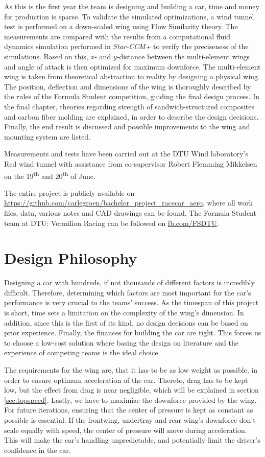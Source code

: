  As this is the first year the team is designing and building a car, time and money for production is sparse. To validate the simulated optimizations, a wind tunnel test is performed on a down-scaled wing using Flow Similarity theory. The measurements are compared with the results from a computational fluid dynamics simulation performed in \emph{Star-CCM+} to verify the preciseness of the simulations. Based on this, $x$- and $y$-distance between the multi-element wings and angle of attack is then optimized for maximum downforce. The multi-element wing is taken from theoretical abstraction to reality by designing a physical wing. The position, deflection and dimensions of the wing is thoroughly described by the rules of the Formula Student competition, guiding the final design process. In the final chapter, theories regarding strength of sandwich-structured composites and carbon fiber molding are explained, in order to describe the design decisions. Finally, the end result is discussed and possible improvements to the wing and mounting system are listed.

  Measurements and tests have been carried out at the DTU Wind laboratory's Red wind tunnel with assistance from co-supervisor Robert Flemming Mikkelsen on the 19\textsuperscript{th} and 20\textsuperscript{th} of June.

  The entire project is publicly available on \url{https://github.com/carlegroen/bachelor_project_racecar_aero}, where all work files, data, various notes and CAD drawings can be found. The Formula Student team at DTU: Vermilion Racing can be followed on \url{fb.com/FSDTU}.

\section{Design Philosophy}
  Designing a car with hundreds, if not thousands of different factors is incredibly difficult. Therefore, determining which factors are most important for the car's performance is very crucial to the teams' success. As the timespan of this project is short, time sets a limitation on the complexity of the wing's dimension. In addition, since this is the first of its kind, no design decisions can be based on prior experience. Finally, the finances for building the car are tight. This forces us to choose a low-cost solution where basing the design on literature and the experience of competing teams is the ideal choice.

  The requirements for the wing are, that it has to be as low weight as possible, in order to ensure optimum acceleration of the car. Thereto, drag has to be kept low, but the effect from drag is near negligible, which will be explained in section \ref{sec:topspeed}. Lastly, we have to maximize the downforce provided by the wing. For future iterations, ensuring that the center of pressure is kept as constant as possible is essential. If the frontwing, undertray and rear wing's downforce don't scale equally with speed, the center of pressure will move during acceleration. This will make the car's handling unpredictable, and potentially limit the driver's confidence in the car.

